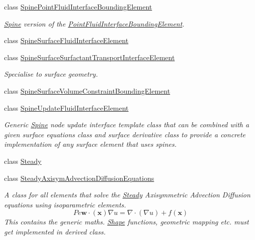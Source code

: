 \begin{DoxyCompactItemize}
class \hyperlink{classoomph_1_1SpinePointFluidInterfaceBoundingElement}{Spine\+Point\+Fluid\+Interface\+Bounding\+Element}
\begin{DoxyCompactList}\small\item\em \hyperlink{classoomph_1_1Spine}{Spine} version of the \hyperlink{classoomph_1_1PointFluidInterfaceBoundingElement}{Point\+Fluid\+Interface\+Bounding\+Element}. \end{DoxyCompactList}\item 
class \hyperlink{classoomph_1_1SpineSurfaceFluidInterfaceElement}{Spine\+Surface\+Fluid\+Interface\+Element}
\item 
class \hyperlink{classoomph_1_1SpineSurfaceSurfactantTransportInterfaceElement}{Spine\+Surface\+Surfactant\+Transport\+Interface\+Element}
\begin{DoxyCompactList}\small\item\em Specialise to surface geometry. \end{DoxyCompactList}\item 
class \hyperlink{classoomph_1_1SpineSurfaceVolumeConstraintBoundingElement}{Spine\+Surface\+Volume\+Constraint\+Bounding\+Element}
\item 
class \hyperlink{classoomph_1_1SpineUpdateFluidInterfaceElement}{Spine\+Update\+Fluid\+Interface\+Element}
\begin{DoxyCompactList}\small\item\em Generic \hyperlink{classoomph_1_1Spine}{Spine} node update interface template class that can be combined with a given surface equations class and surface derivative class to provide a concrete implementation of any surface element that uses spines. \end{DoxyCompactList}\item 
class \hyperlink{classoomph_1_1Steady}{Steady}
\item 
class \hyperlink{classoomph_1_1SteadyAxisymAdvectionDiffusionEquations}{Steady\+Axisym\+Advection\+Diffusion\+Equations}
\begin{DoxyCompactList}\small\item\em A class for all elements that solve the \hyperlink{classoomph_1_1Steady}{Steady} Axisymmetric Advection Diffusion equations using isoparametric elements. \[ Pe \mathbf{w}\cdot(\mathbf{x}) \nabla u = \nabla \cdot \left( \nabla u \right) + f(\mathbf{x}) \] This contains the generic maths. \hyperlink{classoomph_1_1Shape}{Shape} functions, geometric mapping etc. must get implemented in derived class. \end{DoxyCompactList}\item 

\end{DoxyCompactItemize}
